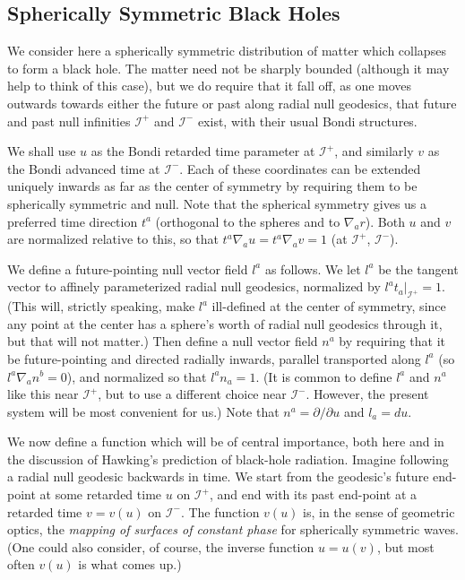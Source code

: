 \documentclass[
%
draft    %
,numberedheadings 
,bibliocites
  ]
  {aipproc}
\newcommand{\scrif}{{{\mathscr I}^{+}}}
\newcommand{\scrip}{{{\mathscr I}^{-}}}
\newcommand{\vv}{{v}}
\newcommand{\uu}{{u}}
\begin{document}
\subsection{Spherically Symmetric Black Holes}\label{sphol}

We consider here a spherically symmetric distribution of matter which collapses to form a black hole.  The matter need not be sharply bounded (although it may help to think of this case), but we do require that it fall off, as one moves outwards towards either the future or past along radial null geodesics, that future and past null infinities $\scrif$ and $\scrip$ exist, with their usual Bondi structures.  

We shall use $u$ as the Bondi retarded time parameter at $\scrif$, and similarly $v$ as the Bondi advanced time at $\scrip$.  
Each of these coordinates can be extended uniquely inwards as far as the center of symmetry by requiring them to be spherically symmetric and null.
Note that the spherical symmetry gives us a preferred time direction $t^a$ (orthogonal to the spheres and to $\nabla _a r$).  Both $u$ and $v$ are normalized relative to this, so that $t^a\nabla _au=t^a\nabla _av=1$ (at $\scrif$, $\scrip$).

We define a future-pointing null vector field $l^a$ as follows.  We let $l^a$ be the tangent vector to affinely parameterized radial null geodesics, normalized by 
$l^at_a\Bigr| _\scrif =1$.  (This will, strictly speaking, make $l^a$ ill-defined at the center of symmetry, since any point at the center has a sphere's worth of radial null geodesics through it, but that will not matter.)  Then define a null vector field $n^a$ by requiring that it be future-pointing and directed radially inwards, parallel transported along $l^a$ (so $l^a\nabla _a n^b=0$), and normalized so that $l^an_a=1$.  (It is common to define $l^a$ and $n^a$ like this near $\scrif$, but to use a different choice near $\scrip$.  However, the present system will be most convenient for us.)  Note that $n^a=\partial /\partial u$ and $l_a=du$.

We now define a function which will be of central importance, both here and in the discussion of Hawking's prediction of black-hole radiation.  Imagine following a radial null geodesic backwards in time.  We start from the geodesic's future end-point at some retarded time $u$ on $\scrif$, and end with its past end-point at a retarded time $v=\vv (u)$ on $\scrip$.  The function $\vv (u)$ is, in the sense of geometric optics, the {\em mapping of surfaces of constant phase} for spherically symmetric waves.  (One could also consider, of course, the inverse function $u=\uu (v)$, but most often $\vv (u)$ is what comes up.)
\end{document}
